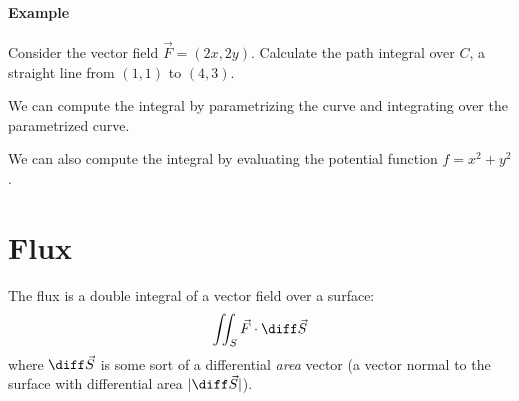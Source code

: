 \documentclass{multi}
\begin{document}
\paragraph{Example}

Consider the vector field \(\vec F = (2x, 2y)\). Calculate the path integral over \(C\), a straight line from \((1, 1)\) to \((4, 3)\).

We can compute the integral by parametrizing the curve and integrating over the parametrized curve.

We can also compute the integral by evaluating the potential function \(f = x^2 + y^2\).

\section*{Flux}

The flux is a double integral of a vector field over a surface:
\[
    \iint_S \vec F \cdot \diff \vec S
\]
where \(\diff \vec S\) is some sort of a differential \emph{area} vector (a vector normal to the surface with differential area \(|\diff \vec S|\)).

\end{document}
